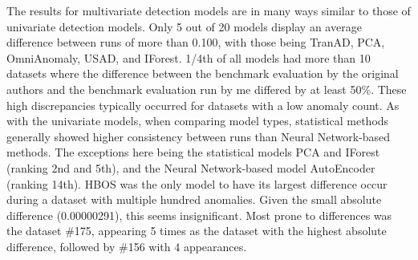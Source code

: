\documentclass[12pt,oneside]{article}
\begin{document}
The results for multivariate detection models are in many ways similar to those of univariate detection models. Only 5 out of 20 models display an average difference between runs of more than 0.100, with those being TranAD, PCA, OmniAnomaly, USAD, and IForest. 1/4th of all models had more than 10 datasets where the difference between the benchmark evaluation by the original authors and the benchmark evaluation run by me differed by at least 50\%. These high discrepancies typically occurred for datasets with a low anomaly count. As with the univariate models, when comparing model types, statistical methods generally showed higher consistency between runs than Neural Network-based methods. The exceptions here being the statistical models PCA and IForest (ranking 2nd and 5th), and the Neural Network-based model AutoEncoder (ranking 14th). HBOS was the only model to have its largest difference occur during a dataset with multiple hundred anomalies. Given the small absolute difference (0.00000291), this seems insignificant. Most prone to differences was the dataset \#175, appearing 5 times as the dataset with the highest absolute difference, followed by \#156 with 4 appearances. 
\end{document}
